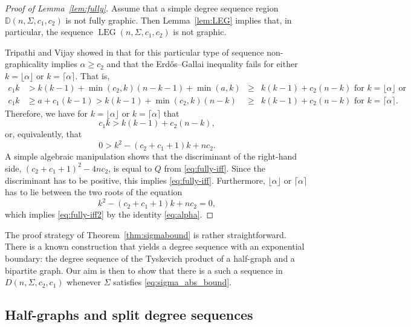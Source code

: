 \documentclass[11pt]{elsarticle}
\theoremstyle{plain}
\theoremstyle{definition}
\def\mD{\mathbb{D}}
\newcommand{\fal}{\lfloor \alpha \rfloor}
\newcommand{\ceal}{\lceil \alpha \rceil}
\newcommand{\lb}{\operatorname{LEG}}
\begin{document}
\begin{proof}[Proof of Lemma~\ref{lem:fully}]

Assume that a simple degree sequence region $\mD(n,\Sigma,c_1,c_2)$ is not fully graphic.
Then Lemma~\ref{lem:LEG} implies that, in particular, the
sequence $\lb(n,\Sigma,c_1,c_2)$ is not graphic.

Tripathi and Vijay showed in \cite{TV03} that for this particular type of sequence non-graphicality implies $\alpha \geq c_2$ and that the Erdős–Gallai inequality fails for either $k=\fal$ or $k = \ceal$. That is,
\begin{align*}
c_1 k &> k(k-1) + \min(c_2,k)(n-k-1) + \min(a, k) &\geq& k(k-1)+c_2(n-k)  \mbox{ for } k = \fal \mbox{ or}\\
c_1 k &\geq a + c_1 (k-1)> k(k-1) + \min(c_2,k)(n-k) &\geq& k(k-1) + c_2(n-k) \mbox{ for } k = \ceal.
\end{align*}
Therefore, we have for $k=\fal$ or $k=\ceal$ that
\begin{equation}\label{eq:k=a3}
    c_1 k > k(k-1) + c_2(n-k),
\end{equation}
or, equivalently, that
\begin{equation}\label{eq:alpha2}
0 > k^2 - (c_2 + c_1 + 1)k + nc_2.
\end{equation}
A simple algebraic manipulation shows that the discriminant of the right-hand side, $ (c_2+c_1+1)^2-4nc_2$, is equal to $Q$ from \eqref{eq:fully-iff}. Since the discriminant has to be positive, this implies \eqref{eq:fully-iff}. Furthermore, $\fal$ or $\ceal$ has to lie between the two roots of the equation
\[
k^2 - (c_2 + c_1 + 1)k + nc_2 = 0,
\]
which implies \eqref{eq:fully-iff2} by the identity \eqref{eq:alpha}.
\end{proof}

The proof strategy of Theorem~\ref{thm:sigmabound} is rather straightforward. There is a known construction that yields a degree sequence with an exponential boundary: the degree sequence of the Tyskevich product of a half-graph and a bipartite graph. Our aim is then to show that there is a such a sequence in $D(n,\Sigma,c_2,c_1)$ whenever $\Sigma$ satisfies \eqref{eq:sigma_abs_bound}.

\subsection{Half-graphs and split degree sequences}
\end{document}
